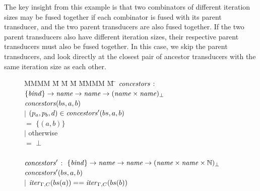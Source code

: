 The key insight from this example is that two combinators of different iteration sizes may be fused together if each combinator is fused with its parent transducer, and the two parent transducers are also fused together.
If the two parent transducers also have different iteration sizes, their respective parent transducers must also be fused together.
In this case, we skip the parent transducers, and look directly at the closest pair of ancestor transducers with the same iteration size as each other.


\begin{figure}
%
\begin{tabbing}
MMMM \= M \= M \= M \= MMMM \= M \= \kill
$\mathit{concestors}$ \> $:$ \> $\{\mathit{bind}\} \to \mathit{name} \to \mathit{name} \to (\mathit{name} \times \mathit{name})_\bot$ \\
$\mathit{concestors}(bs, a, b)$ \\
        \> $|$ \> $(p_a,p_b,d) \in \mathit{concestors}'(bs,a,b)$ \\
        \>     \>                      \> $=$ \> $\{(a, b)\}$ \\
        \> $|$ \> otherwise \\
        \>     \>                      \> $=$    \> $\bot$ \\
\\
$\mathit{concestors}'$ \> $:$ \> $\{\mathit{bind}\} \to \mathit{name} \to \mathit{name} \to (\mathit{name} \times \mathit{name} \times \mathbb{N})_\bot$ \\
$\mathit{concestors}'(bs, a, b)$ \\
        \> $|$ \> $\mathit{iter}_{\Gamma,C}(bs(a)) == \mathit{iter}_{\Gamma,C}(bs(b))$ \\

\end{tabbing}
\end{figure}
